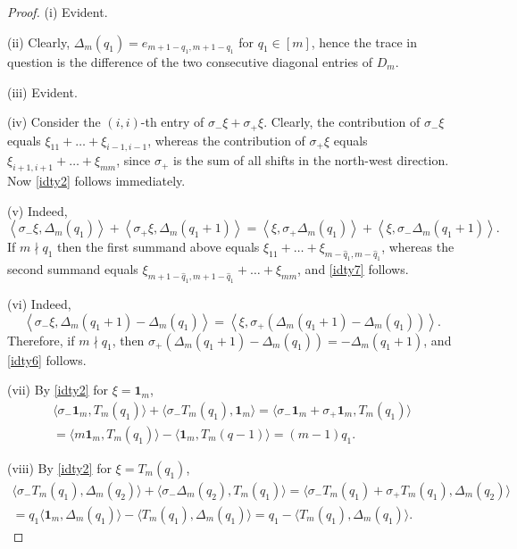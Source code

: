 \documentclass{amsart}
\theoremstyle{definition}
\theoremstyle{remark}
\numberwithin{equation}{section}
\numberwithin{theorem}{section}
\begin{document}
\begin{proof}
 (i) Evident.
 
 (ii) Clearly,  $\Delta_m(q_1)=e_{m+1- q_1, m+1- q_1}$ for $q_1\in [m]$, 
 hence the trace in question is the difference of the two 
 consecutive diagonal entries of $D_m$.
 
 (iii) Evident.
 
 (iv) Consider the $(i,i)$-th entry of $\sigma_-\xi+\sigma_+\xi$. Clearly, the contribution of $\sigma_-\xi$ equals $\xi_{11}+\dots+\xi_{i-1,i-1}$, whereas the contribution of $\sigma_+\xi$
 equals $\xi_{i+1,i+1}+\dots+\xi_{mm}$, since $\sigma_+$ is the sum of all shifts in the north-west direction. Now \eqref{idty2} follows immediately.

(v) Indeed, 
$$
\left\langle\sigma_-\xi,\Delta_m(q_1)\right\rangle+\left\langle\sigma_+\xi,\Delta_m(q_1+1)\right\rangle
=\left\langle\xi,\sigma_+\Delta_m(q_1)\right\rangle+
\left\langle\xi,\sigma_-\Delta_m(q_1+1)\right\rangle.
$$
If $m\nmid q_1$ then the first summand above equals $\xi_{11}+\dots+\xi_{m-\hat q_1, m-\hat q_1}$, whereas
the second summand equals $\xi_{m+1-\hat q_1, m+1-\hat q_1}+\dots+\xi_{mm}$, and \eqref{idty7} follows. 

 (vi) Indeed, 
$$
\left\langle\sigma_-\xi,\Delta_m(q_1+1)-\Delta_m(q_1)\right\rangle=
\left\langle\xi,\sigma_+(\Delta_m(q_1+1)-\Delta_m(q_1))\right\rangle.
$$
  Therefore, if $m\nmid q_1$, then $\sigma_+(\Delta_m(q_1+1)-\Delta_m(q_1))=-\Delta_m(q_1+1)$, and \eqref{idty6} follows.
  
 (vii) By \eqref{idty2} for $\xi={\mathbf 1}_m$,
 \begin{gather*}
 \langle\sigma_-{\mathbf 1}_m,T_m(q_1)\rangle+\langle\sigma_-T_m(q_1),{\mathbf 1}_m\rangle=
 \langle\sigma_-{\mathbf 1}_m+\sigma_+{\mathbf 1}_m, T_m(q_1)\rangle\\
 =\langle m{\mathbf 1}_m,T_m(q_1)\rangle-\langle {\mathbf 1}_m,T_m(q-1)\rangle=(m-1)q_1.
 \end{gather*}
 
 (viii) By \eqref{idty2} for $\xi=T_m(q_1)$,
 \begin{gather*}
 \langle\sigma_-T_m(q_1),\Delta_m(q_2)\rangle+\langle\sigma_-\Delta_m(q_2), T_m(q_1)\rangle=  
  \langle\sigma_-T_m(q_1)+\sigma_+T_m(q_1),\Delta_m(q_2)\rangle \\
 = q_1\langle {\mathbf 1}_m, \Delta_m(q_1)\rangle-\langle T_m(q_1),\Delta_m(q_1)\rangle=
 q_1 -   \langle T_m(q_1),\Delta_m(q_1)\rangle.
 \end{gather*}
 

\end{proof}
\end{document}
